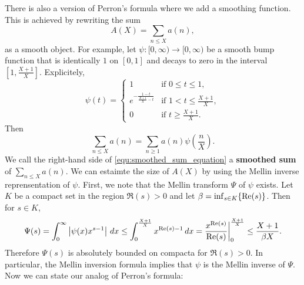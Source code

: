       There is also a version of Perron's formula where we add a smoothing function. This is achieved by rewriting the sum
      \[
        A(X) = \sum_{n \le X}a(n),
      \]
      as a smooth object. For example, let $\psi:[0,\infty) \to [0,\infty)$ be a smooth bump function that is identically $1$ on $[0,1]$ and decays to zero in the interval $\left[1,\frac{X+1}{X}\right]$. Explicitely,
      \[
          \psi(t) = \begin{cases} 1 & \text{if $0 \le t \le 1$}, \\ e^{-\frac{1-t}{\frac{X+1}{X}-t}} & \text{if $1 < t \le \frac{X+1}{X}$}, \\ 0 & \text{if $t \ge \frac{X+1}{X}$}. \end{cases}
      \]
      Then 
      \begin{equation}\label{equ:smoothed_sum_equation}
        \sum_{n \le X}a(n) = \sum_{n \ge 1}a(n)\psi\left(\frac{n}{X}\right).
      \end{equation}
      We call the right-hand side of \cref{equ:smoothed_sum_equation} a \textbf{smoothed sum} of $\sum_{n \le X}a(n)$. We can estaimte the size of $A(X)$ by using the Mellin inverse reprensentation of $\psi$. First, we note that the Mellin transform $\Psi$ of $\psi$ exists. Let $K$ be a compact set in the region $\Re(s) > 0$ and let $\beta = \inf_{s \in K}\{\mathrm{Re}(s)\}$. Then for $s \in K$,
      \[
        \Psi(s) = \int_{0}^{\infty}\left|\psi(x)x^{s-1}\right|\,dx \le \int_{0}^{\frac{X+1}{X}}x^{\mathrm{Re}(s)-1}\,dx = \frac{x^{\mathrm{Re}(s)}}{\mathrm{Re}(s)}\bigg|_{0}^{\frac{X+1}{X}} \le \frac{X+1}{\beta X}.
      \]
      Therefore $\Psi(s)$ is absolutely bounded on compacta for $\Re(s) > 0$. In particular, the Mellin inversion formula implies that $\psi$ is the Mellin inverse of $\Psi$. Now we can state our analog of Perron's formula:

